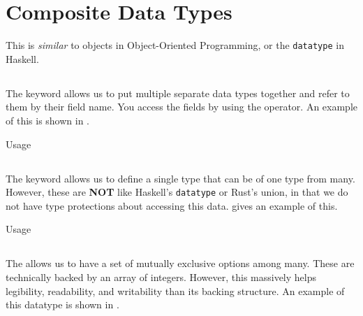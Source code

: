 \section{Composite Data Types}\label{sec:Composite_Data_Types}
This is \textit{similar} to objects in Object-Oriented Programming, or the \texttt{datatype} in Haskell.

\subsection{\texorpdfstring{}{\texttt{struct}}}\label{subsec:struct}
The  keyword allows us to put multiple separate data types together and refer to them by their field name.
You access the fields by using the  operator.
An example of this is shown in .

\begin{listing}[h!tbp]
\caption{\texorpdfstring{}{\texttt{struct}} Usage}
\label{lst:struct_Usage}
\end{listing}

\subsection{\texorpdfstring{}{\texttt{union}}}\label{subsec:union}
The  keyword allows us to define a single type that can be of one type from many.
However, these are \textbf{NOT} like Haskell's \texttt{datatype} or Rust's union, in that we do not have type protections about accessing this data.
 gives an example of this.

\begin{listing}[h!tbp]
\caption{\texorpdfstring{}{\texttt{union}} Usage}
\label{lst:union_Usage}
\end{listing}

\subsection{\texorpdfstring{}{\texttt{enum}}}\label{subsec:enum}
The  allows us to have a set of mutually exclusive options among many.
These are technically backed by an array of integers.
However, this massively helps legibility, readability, and writability than its backing structure.
An example of this datatype is shown in .

